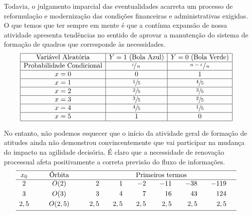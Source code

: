 \documentclass[fleqn]{icat-ufal}
\begin{document}
Todavia, o julgamento imparcial das eventualidades acarreta um processo de 
reformulação e modernização das condições financeiras e administrativas exigidas. 
O que temos que ter sempre em mente é que a contínua expansão de nossa atividade 
apresenta tendências no sentido de aprovar a manutenção do sistema de formação de 
quadros que corresponde às necessidades. 
\[
\begin{array}{|c|c|c|}
	\hline
	   \text{Variável Aleatória}     & Y=1 \text{ (Bola Azul)} & Y=0 \text{ (Bola Verde)} \\ \hline
	\text{Probabilidade Condicional} &    \sfrac{i}{\,n\,}     &  \sfrac{\,n-i\,}{\,n\,}  \\ \hline
	              x=0                &            0            &            1             \\ \hline
	              x=1                &      \sfrac{1}{5}       &       \sfrac{4}{5}       \\ \hline
	              x=2                &      \sfrac{2}{5}       &       \sfrac{3}{5}       \\ \hline
	              x=3                &      \sfrac{3}{5}       &       \sfrac{2}{5}       \\ \hline
	              x=4                &      \sfrac{4}{5}       &       \sfrac{1}{5}       \\ \hline
	              x=5                &            1            &            0             \\ \hline
\end{array}
\]

No entanto, não podemos esquecer que o início da atividade geral de formação de
atitudes ainda não demonstrou convincentemente que vai participar na mudança do
impacto na agilidade decisória. É claro que a necessidade de renovação
processual afeta positivamente a correta previsão do fluxo de informações. 
\[
\begin{array}{ccrrrrrr}
	\hline
	x_0 & {\qquad \text{Órbita} \qquad} &                \multicolumn{6}{c}{\text{Primeiros termos}}                \\ \hline
	 2  &            O(2  )             &   2 & \quad   1 & \quad   -2 & \quad  -11 & \quad  -38 & \quad -119 \quad \\[1mm]
	 3  &            O(3  )             &   3 & \quad   4 & \quad    7 & \quad   16 & \quad   43 & \quad  124 \quad \\[1mm]
	2,5 &            O(2,5)             & 2,5 & \quad 2,5 & \quad  2,5 & \quad  2,5 & \quad  2,5 & \quad  2,5 \quad \\[1mm] \hline
\end{array}
\]
\end{document}
